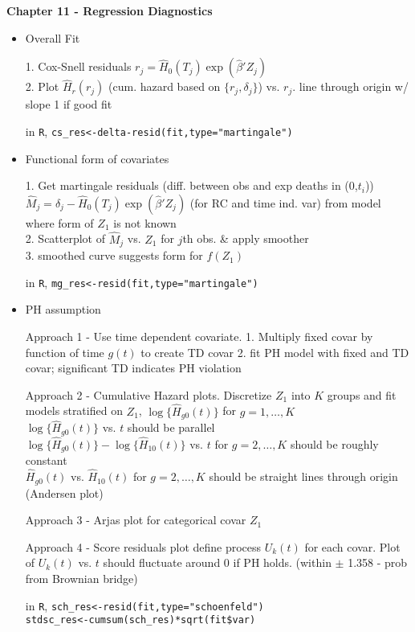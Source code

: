 \documentclass[11pt]{article}
\begin{document}
\textbf{Chapter 11 - Regression Diagnostics}
\begin{itemize}
	\item Overall Fit
	
	1. Cox-Snell residuals $r_j=\hat{H}_0(T_j)\exp(\hat{\beta}'Z_j)$\\
	2. Plot $\hat{H}_r(r_j)$ (cum. hazard based on $\{r_j, \delta_j\}$) vs. $r_j$. line through origin w/ slope 1 if good fit
	
	in \verb|R|, 
	\verb|cs_res<-delta-resid(fit,type="martingale")|
	
	\item Functional form of covariates
	
	1. Get martingale residuals (diff. between obs and exp deaths in (0,$t_i$)) $\hat{M}_j=\delta_j - \hat{H}_0(T_j)\exp(\hat{\beta}'Z_j)$ (for RC and time ind. var) from model where form of $Z_1$ is not known\\
	2. Scatterplot of $\hat{M}_j$ vs. $Z_1$ for $j$th obs. \& apply smoother\\
	3. smoothed curve suggests form for $f(Z_1)$
	
	in \verb|R|, 
	\verb|mg_res<-resid(fit,type="martingale")|
	
	\item PH assumption
	
	Approach 1 - Use time dependent covariate. 1. Multiply fixed covar by function of time $g(t)$ to create TD covar 2. fit PH model with fixed and TD covar; significant TD indicates PH violation
	
	Approach 2 - Cumulative Hazard plots. Discretize $Z_1$ into $K$ groups and fit models stratified on $Z_1$, $\log\{\hat{H}_{g0}(t)\}$ for $g=1,\ldots,K$\\
	$ \log\{\hat{H}_{g0}(t)\}$ vs. $t$ should be parallel\\
	$ \log\{\hat{H}_{g0}(t)\} - \log\{\hat{H}_{10}(t)\}$ vs. $t$ for $g=2,\ldots,K$ should be roughly constant\\
	$ \hat{H}_{g0}(t)$ vs. $\hat{H}_{10}(t)$ for $g=2,\ldots,K$ should be straight lines through origin (Andersen plot)
	
	Approach 3 - Arjas plot for categorical covar $Z_1$
	
	Approach 4 - Score residuals plot
	define process $U_k(t)$ for each covar. Plot of $U_k(t)$ vs. $t$ should fluctuate around 0 if PH holds. (within $\pm$ 1.358 - prob from Brownian bridge)
	
	in \verb|R|, \verb|sch_res<-resid(fit,type="schoenfeld")|\\ \verb|stdsc_res<-cumsum(sch_res)*sqrt(fit$var)|
	

\end{itemize}
\end{document}
